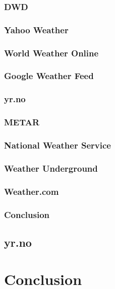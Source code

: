 
\subsubsection{DWD}

\subsubsection{Yahoo Weather}

\subsubsection{World Weather Online}

\subsubsection{Google Weather Feed}

\subsubsection{yr.no}

\subsubsection{METAR}

\subsubsection{National Weather Service}

\subsubsection{Weather Underground}

\subsubsection{Weather.com}

\subsubsection{Conclusion}

\subsection{yr.no}

\section{Conclusion}
\label{sec:weather_conclusion}
